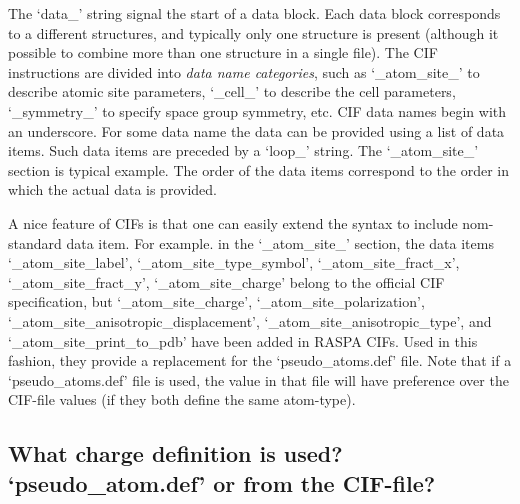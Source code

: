 The `data\_' string signal the start of a data block. Each data block corresponds to a different structures, and typically only one structure is present (although it
possible to combine more than one structure in a single file).
The CIF instructions are divided into \emph{data name categories}, such as `\_atom\_site\_' to describe atomic site parameters, `\_cell\_'
to describe the cell parameters, `\_symmetry\_' to specify  space group symmetry, etc.
CIF data names begin with an underscore. For some data name the data can be provided using a list of data items. Such data items are preceded by a `loop\_' string.
The `\_atom\_site\_' section is typical example. The order of the data items correspond to the order in which the actual data is provided.

A nice feature of CIFs is that one can easily extend the syntax to include nom-standard data item. For example. in the `\_atom\_site\_' section,
the data items `\_atom\_site\_label', `\_atom\_site\_type\_symbol', `\_atom\_site\_fract\_x', `\_atom\_site\_fract\_y', `\_atom\_site\_charge' belong to the official CIF specification,
but `\_atom\_site\_charge', `\_atom\_site\_polarization', `\_atom\_site\_anisotropic\_displacement', `\_atom\_site\_anisotropic\_type',
and `\_atom\_site\_print\_to\_pdb' have been added in RASPA CIFs. Used in this fashion, they provide a replacement for the `pseudo\_atoms.def' file.
Note that if a `pseudo\_atoms.def' file is used, the value in that file will have preference over the CIF-file values (if they both define the same atom-type).

\subsection{What charge definition is used? `pseudo\_atom.def' or from the CIF-file?}

